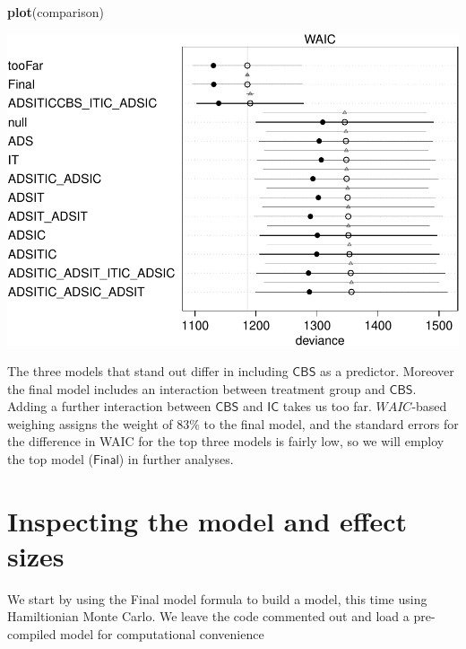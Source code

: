 \documentclass[10pt,dvipsnames,enabledeprecatedfontcommands]{scrartcl}
\newenvironment{Shaded}{\begin{snugshade}}{\end{snugshade}}
\newcommand{\KeywordTok}[1]{\textcolor[rgb]{0.13,0.29,0.53}{\textbf{#1}}}
\newcommand{\NormalTok}[1]{#1}
\begin{document}
\begin{Shaded}
\begin{Highlighting}[]
\KeywordTok{plot}\NormalTok{(comparison)}
\end{Highlighting}
\end{Shaded}

\begin{center}\includegraphics[width=1\linewidth]{bayesianReport3_files/figure-latex/unnamed-chunk-9-1} \end{center}

\normalsize

The three models that stand out differ in including \(\mathsf{CBS}\) as
a predictor. Moreover the final model includes an interaction between
treatment group and \(\mathsf{CBS}\). Adding a further interaction
between \(\mathsf{CBS}\) and \(\mathsf{IC}\) takes us too far.
\(WAIC\)-based weighing assigns the weight of \(83\%\) to the final
model, and the standard errors for the difference in WAIC for the top
three models is fairly low, so we will employ the top model
(\(\mathsf{Final}\)) in further analyses.

\section{Inspecting the model and effect
sizes}\label{inspecting-the-model-and-effect-sizes}

We start by using the \textsf{Final} model formula to build a model,
this time using Hamiltionian Monte Carlo. We leave the code commented
out and load a pre-compiled model for computational convenience

\vspace{1mm} \footnotesize
\end{document}
